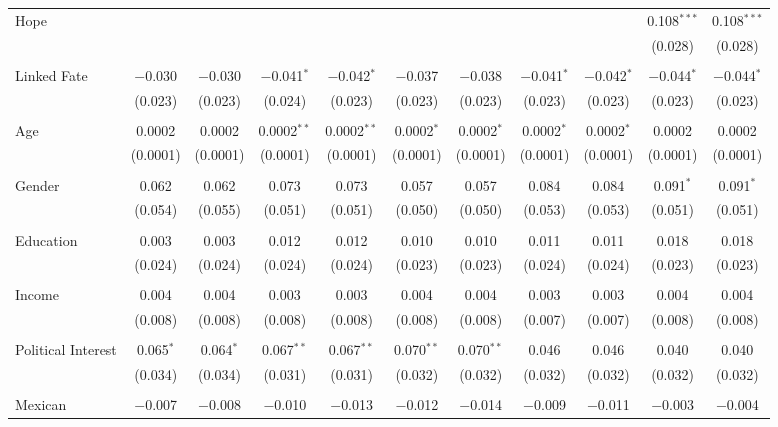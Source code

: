 \begin{table}[!htbp]
\begin{tabular}{@{\extracolsep{5pt}}lcccccccccc}
 Hope &  &  &  &  &  &  &  &  & 0.108$^{***}$ & 0.108$^{***}$ \\ 
  &  &  &  &  &  &  &  &  & (0.028) & (0.028) \\ 
  & & & & & & & & & & \\ 
 Linked Fate & $-$0.030 & $-$0.030 & $-$0.041$^{*}$ & $-$0.042$^{*}$ & $-$0.037 & $-$0.038 & $-$0.041$^{*}$ & $-$0.042$^{*}$ & $-$0.044$^{*}$ & $-$0.044$^{*}$ \\ 
  & (0.023) & (0.023) & (0.024) & (0.023) & (0.023) & (0.023) & (0.023) & (0.023) & (0.023) & (0.023) \\ 
  & & & & & & & & & & \\ 
 Age & 0.0002 & 0.0002 & 0.0002$^{**}$ & 0.0002$^{**}$ & 0.0002$^{*}$ & 0.0002$^{*}$ & 0.0002$^{*}$ & 0.0002$^{*}$ & 0.0002 & 0.0002 \\ 
  & (0.0001) & (0.0001) & (0.0001) & (0.0001) & (0.0001) & (0.0001) & (0.0001) & (0.0001) & (0.0001) & (0.0001) \\ 
  & & & & & & & & & & \\ 
 Gender & 0.062 & 0.062 & 0.073 & 0.073 & 0.057 & 0.057 & 0.084 & 0.084 & 0.091$^{*}$ & 0.091$^{*}$ \\ 
  & (0.054) & (0.055) & (0.051) & (0.051) & (0.050) & (0.050) & (0.053) & (0.053) & (0.051) & (0.051) \\ 
  & & & & & & & & & & \\ 
 Education & 0.003 & 0.003 & 0.012 & 0.012 & 0.010 & 0.010 & 0.011 & 0.011 & 0.018 & 0.018 \\ 
  & (0.024) & (0.024) & (0.024) & (0.024) & (0.023) & (0.023) & (0.024) & (0.024) & (0.023) & (0.023) \\ 
  & & & & & & & & & & \\ 
 Income & 0.004 & 0.004 & 0.003 & 0.003 & 0.004 & 0.004 & 0.003 & 0.003 & 0.004 & 0.004 \\ 
  & (0.008) & (0.008) & (0.008) & (0.008) & (0.008) & (0.008) & (0.007) & (0.007) & (0.008) & (0.008) \\ 
  & & & & & & & & & & \\ 
 Political Interest & 0.065$^{*}$ & 0.064$^{*}$ & 0.067$^{**}$ & 0.067$^{**}$ & 0.070$^{**}$ & 0.070$^{**}$ & 0.046 & 0.046 & 0.040 & 0.040 \\ 
  & (0.034) & (0.034) & (0.031) & (0.031) & (0.032) & (0.032) & (0.032) & (0.032) & (0.032) & (0.032) \\ 
  & & & & & & & & & & \\ 
 Mexican & $-$0.007 & $-$0.008 & $-$0.010 & $-$0.013 & $-$0.012 & $-$0.014 & $-$0.009 & $-$0.011 & $-$0.003 & $-$0.004 \\ 

\end{tabular}
\end{table}
